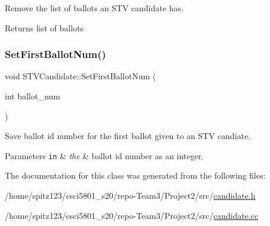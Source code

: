 Remove the list of ballots an S\+TV candidate has. 

\begin{DoxyReturn}{Returns}
list of ballots 
\end{DoxyReturn}
\mbox{\label{classSTVCandidate_af57688ad8fabeeff8c6738779c7bdc3e}} 
\subsubsection{\texorpdfstring{Set\+First\+Ballot\+Num()}{SetFirstBallotNum()}}
{\footnotesize\ttfamily void S\+T\+V\+Candidate\+::\+Set\+First\+Ballot\+Num (\begin{DoxyParamCaption}\item[{int}]{ballot\+\_\+num }\end{DoxyParamCaption})}



Save ballot id number for the first ballot given to an S\+TV candiate. 


\begin{DoxyParams}[1]{Parameters}
\mbox{\tt in}  & {\em the} & ballot id number as an integer. \\
\hline
\end{DoxyParams}


The documentation for this class was generated from the following files\+:\begin{DoxyCompactItemize}
\item 
/home/spitz123/csci5801\+\_\+s20/repo-\/\+Team3/\+Project2/src/\hyperlink{candidate_8h}{candidate.\+h}\item 
/home/spitz123/csci5801\+\_\+s20/repo-\/\+Team3/\+Project2/src/\hyperlink{candidate_8cc}{candidate.\+cc}\end{DoxyCompactItemize}
